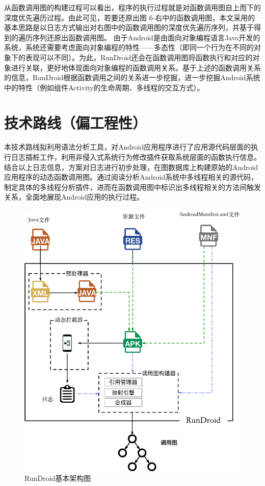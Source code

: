从函数调用图的构建过程可以看出，程序的执行过程就是对函数调用图自上而下的深度优先遍历过程。由此可见，若要还原出图 6-右中的函数调用图，本文采用的基本思路是以日志方式输出对右图中的函数调用图的深度优先遍历序列，并基于得到的遍历序列还原出函数调用图。
由于Android是由面向对象编程语言Java开发的系统，系统还需要考虑面向对象编程的特性——多态性（即同一个行为在不同的对象下的表现可以不同）。为此，RunDroid还会在函数调用图将函数执行和对应的对象进行关联，更好地体现面向对象编程的函数调用关系。基于上述的函数调用关系的信息，RunDroid根据函数调用之间的关系进一步挖掘，进一步挖掘Android系统中的特性（例如组件Activity的生命周期、多线程的交互方式）。

\section{技术路线（偏工程性）}
本技术路线拟利用语法分析工具，对Android应用程序进行了应用源代码层面的执行日志插桩工作，利用非侵入式系统行为修改插件获取系统层面的函数执行信息。结合以上日志信息，方案对日志进行初步处理，在图数据库上构建原始的Android应用程序的动态函数调用图。通过阅读分析Android系统中多线程相关的源代码，制定具体的多线程分析插件，进而在函数调用图中标识出多线程相关的方法间触发关系，全面地展现Android应用的执行过程。


\begin{figure}[h]
	\centering
	\includegraphics[height=0.5\textheight]{./Figures/rundroid-overview.png}
	\caption{ RunDroid基本架构图}
	\label{fig:rundroid_overview}
\end{figure}


